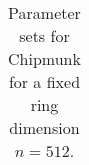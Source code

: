 \begin{table}
\begin{tabular}{ccr|cc|cccrr|crr|c}
  
  
  
    \end{tabular}
    \caption{Parameter sets for Chipmunk for a fixed ring dimension $n=512$.}\label{tab:param}
  \end{table}
\egroup

